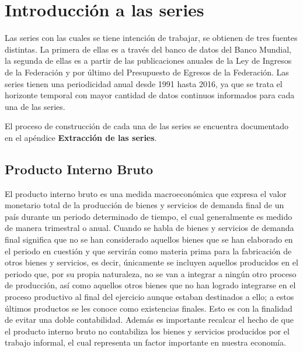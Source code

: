 
\section{Introducci\'on a las series}

Las series con las cuales se tiene intención de trabajar, se obtienen de tres fuentes distintas. La primera de ellas es a través del banco de datos del Banco Mundial, la segunda de ellas es a partir de las publicaciones anuales de la Ley de Ingresos de la Federación y por último del Presupuesto de Egresos de la Federación.  Las series tienen una periodicidad anual desde 1991 hasta 2016, ya que se trata el horizonte temporal con mayor cantidad de datos continuos informados para cada una de las series. \bigskip

El proceso de construcción de cada una de las series se encuentra documentado en el apéndice \textbf{Extracción de las series}.



\subsection{Producto Interno Bruto}


El producto interno bruto es una medida macroeconómica que expresa el valor monetario total de la producción de bienes y servicios de demanda final de un país durante un periodo determinado de tiempo, el cual generalmente es medido de manera trimestral o anual. Cuando se habla de bienes y servicios de demanda final significa que no se han considerado aquellos bienes que se han elaborado en el periodo en cuestión y que servirán como materia prima para la fabricación de otros bienes y servicios, es decir, únicamente se incluyen aquellos producidos en el periodo que, por su propia naturaleza, no se van a integrar a ningún otro proceso de producción, así como aquellos otros bienes que no han logrado integrarse en el proceso productivo al final del ejercicio aunque estaban destinados a ello; a estos últimos productos se les conoce como existencias finales. Esto es con la finalidad de evitar una doble contabilidad. Además es importante recalcar el hecho de que el producto interno bruto no contabiliza los bienes y servicios producidos por el trabajo informal, el cual representa un factor importante en nuestra economía. \bigskip 

